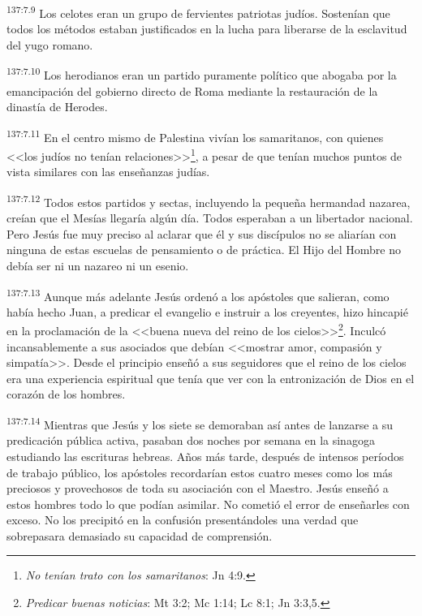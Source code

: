 \par 
\textsuperscript{137:7.9} Los celotes eran un grupo de fervientes patriotas judíos. Sostenían que todos los métodos estaban justificados en la lucha para liberarse de la esclavitud del yugo romano.

\par 
\textsuperscript{137:7.10} Los herodianos eran un partido puramente político que abogaba por la emancipación del gobierno directo de Roma mediante la restauración de la dinastía de Herodes.

\par 
\textsuperscript{137:7.11} En el centro mismo de Palestina vivían los samaritanos, con quienes <<los judíos no tenían relaciones>>\footnote{\textit{No tenían trato con los samaritanos}: Jn 4:9.}, a pesar de que tenían muchos puntos de vista similares con las enseñanzas judías.

\par 
\textsuperscript{137:7.12} Todos estos partidos y sectas, incluyendo la pequeña hermandad nazarea, creían que el Mesías llegaría algún día. Todos esperaban a un libertador nacional. Pero Jesús fue muy preciso al aclarar que él y sus discípulos no se aliarían con ninguna de estas escuelas de pensamiento o de práctica. El Hijo del Hombre no debía ser ni un nazareo ni un esenio.

\par 
\textsuperscript{137:7.13} Aunque más adelante Jesús ordenó a los apóstoles que salieran, como había hecho Juan, a predicar el evangelio e instruir a los creyentes, hizo hincapié en la proclamación de la <<buena nueva del reino de los cielos>>\footnote{\textit{Predicar buenas noticias}: Mt 3:2; Mc 1:14; Lc 8:1; Jn 3:3,5.}. Inculcó incansablemente a sus asociados que debían <<mostrar amor, compasión y simpatía>>. Desde el principio enseñó a sus seguidores que el reino de los cielos era una experiencia espiritual que tenía que ver con la entronización de Dios en el corazón de los hombres.

\par 
\textsuperscript{137:7.14} Mientras que Jesús y los siete se demoraban así antes de lanzarse a su predicación pública activa, pasaban dos noches por semana en la sinagoga estudiando las escrituras hebreas. Años más tarde, después de intensos períodos de trabajo público, los apóstoles recordarían estos cuatro meses como los más preciosos y provechosos de toda su asociación con el Maestro. Jesús enseñó a estos hombres todo lo que podían asimilar. No cometió el error de enseñarles con exceso. No los precipitó en la confusión presentándoles una verdad que sobrepasara demasiado su capacidad de comprensión.

